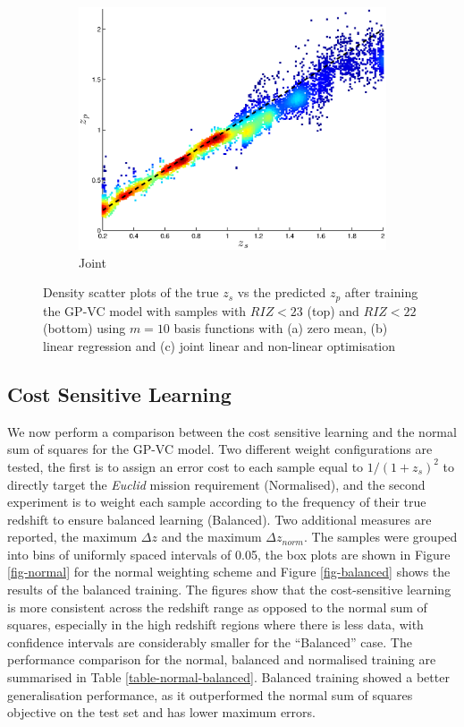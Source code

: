 \documentclass[useAMS,usenatbib,fleqn]{mn2e}
\begin{document}
\begin{figure}
\begin{subfigure}[b]{0.3\textwidth}
                \includegraphics[width=\textwidth]{figures/22_J.eps}
                \caption{Joint}
        \end{subfigure}
        
        \caption{Density scatter plots of the true $z_{s}$ vs the predicted $z_{p}$ after training the GP-VC model with samples with $RIZ<23$ (top) and $RIZ<22$ (bottom) using $m=10$ basis functions with (a) zero mean, (b) linear regression and (c) joint linear and non-linear optimisation}
        \label{fig-RIZ-splits}
\end{figure}


\subsection{Cost Sensitive Learning}
We now perform a comparison between the cost sensitive learning and the normal sum of squares for the GP-VC model. Two different weight configurations are tested, the first is to assign an error cost to each sample equal to $1/\left(1+z_{s}\right)^{2}$ to directly target the {\em Euclid} mission requirement (Normalised), and the second experiment is to weight each sample according to the frequency of their true redshift to ensure balanced learning (Balanced).  Two additional measures are reported, the maximum $\Delta z$ and the maximum $\Delta z_{norm}$. The samples were grouped into bins of uniformly spaced intervals of 0.05, the box plots are shown in Figure \ref{fig-normal} for the normal weighting scheme and Figure \ref{fig-balanced} shows the results of the balanced training. The figures show that the cost-sensitive learning is more consistent across the redshift range as opposed to the normal sum of squares, especially in the high redshift regions where there is less data, with confidence intervals are considerably smaller for the ``Balanced'' case. The performance comparison for the normal, balanced and normalised training are summarised in Table \ref{table-normal-balanced}. Balanced training showed a better generalisation performance, as it outperformed the normal sum of squares objective on the test set and has lower maximum errors.
\end{document}
